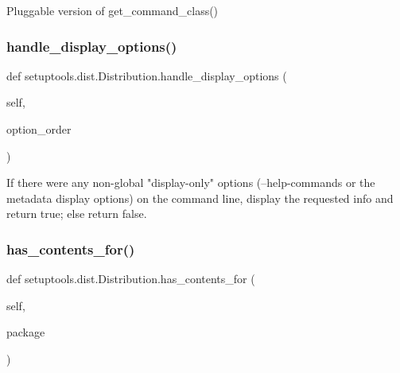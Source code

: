 \begin{DoxyVerb}Pluggable version of get_command_class()\end{DoxyVerb}
 \mbox{\label{classsetuptools_1_1dist_1_1_distribution_ad44e7069904a39a05010160a5b365e4a}} 
\subsubsection{\texorpdfstring{handle\+\_\+display\+\_\+options()}{handle\_display\_options()}}
{\footnotesize\ttfamily def setuptools.\+dist.\+Distribution.\+handle\+\_\+display\+\_\+options (\begin{DoxyParamCaption}\item[{}]{self,  }\item[{}]{option\+\_\+order }\end{DoxyParamCaption})}

\begin{DoxyVerb}If there were any non-global "display-only" options
(--help-commands or the metadata display options) on the command
line, display the requested info and return true; else return
false.
\end{DoxyVerb}
 \mbox{\label{classsetuptools_1_1dist_1_1_distribution_a0d99480ae4beb9ec35a2c99a46721af6}} 
\subsubsection{\texorpdfstring{has\+\_\+contents\+\_\+for()}{has\_contents\_for()}}
{\footnotesize\ttfamily def setuptools.\+dist.\+Distribution.\+has\+\_\+contents\+\_\+for (\begin{DoxyParamCaption}\item[{}]{self,  }\item[{}]{package }\end{DoxyParamCaption})}


